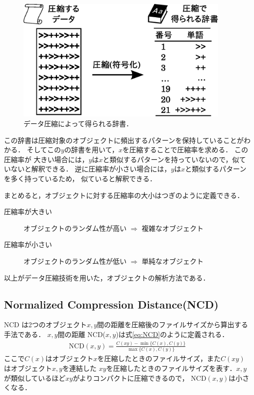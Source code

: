 \begin{figure}[tb]
\begin{center}
\includegraphics[width=10.5cm]{image/dic.eps}
\end{center}
\caption{データ圧縮によって得られる辞書．}
\label{dic}
\end{figure}
この辞書は圧縮対象のオブジェクトに頻出するパターンを保持していることがわかる．
そしてこの$y$の辞書を用いて，$x$を圧縮することで圧縮率を求める．
この圧縮率が
大きい場合には，$y$は$x$と類似するパターンを持っていないので，似ていないと解釈できる．
逆に圧縮率が小さい場合には，$y$は$x$と類似するパターンを多く持っているため，
似ていると解釈できる．

まとめると，オブジェクトに対する圧縮率の大小はつぎのように定義できる．
\begin{description}
	\item [圧縮率が大きい] オブジェクトのランダム性が高い $\Rightarrow$ 複雑なオブジェクト
	\item [圧縮率が小さい] オブジェクトのランダム性が低い $\Rightarrow$ 単純なオブジェクト
\end{description}
以上がデータ圧縮技術を用いた，オブジェクトの解析方法である．


\subsection{Normalized Compression Distance(NCD)}
\label{subsec:NCD}

NCD \cite{NCD} は2つのオブジェクト$x,y$間の距離を圧縮後のファイルサイズから算出する手法である．
$x,y$間の距離 NCD($x,y$)は式\ref{eq:NCD}のように定義される．
\begin{eqnarray}
\mathrm{NCD}(x,y) = \frac{C(xy) - \min\{C(x),C(y)\}}{\max\{C(x),C(y)\}} \label{eq:NCD}
\end{eqnarray}
ここで$C(x)$はオブジェクト$x$を圧縮したときのファイルサイズ，また$C(xy)$はオブジェクト$x,y$を連結した
$xy$を圧縮したときのファイルサイズを表す．$x,y$が類似しているほど$xy$がよりコンパクトに圧縮できるので，
$\mbox{NCD}(x,y)$は小さくなる．

